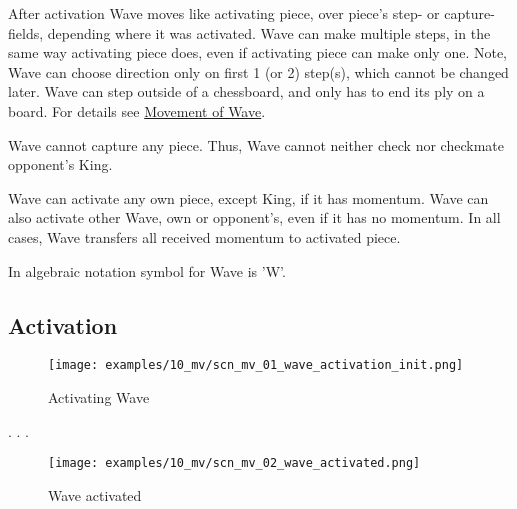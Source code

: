 After activation Wave moves like activating piece, over piece's step- or capture-
fields, depending where it was activated. Wave can make multiple steps, in the
same way activating piece does, even if activating piece can make only one. Note,
Wave can choose direction only on first 1 (or 2) step(s), which cannot be changed
later. Wave can step outside of a chessboard, and only has to end its ply on a
board. For details see
\hyperref[sec:Appendix/Movement of Wave]{Movement of Wave}.

Wave cannot capture any piece. Thus, Wave cannot neither check nor checkmate
opponent's King.

Wave can activate any own piece, except King, if it has momentum. Wave can
also activate other Wave, own or opponent's, even if it has no momentum. In
all cases, Wave transfers all received momentum to activated piece.

In algebraic notation symbol for Wave is 'W'.

\clearpage %

\subsection*{Activation}

\vspace*{-1.4\baselineskip}
\noindent
\begin{figure}[!h]
\texttt{[image: examples/10\_mv/scn\_mv\_01\_wave\_activation\_init.png]}
\caption{Activating Wave}
\label{fig:scn_mv_01_wave_activation_init}
\end{figure}

. . .


\clearpage %

\vspace*{-2.1\baselineskip}
\noindent
\begin{figure}[!h]
\texttt{[image: examples/10\_mv/scn\_mv\_02\_wave\_activated.png]}
\caption{Wave activated}
\label{fig:scn_mv_02_wave_activated}
\end{figure}

